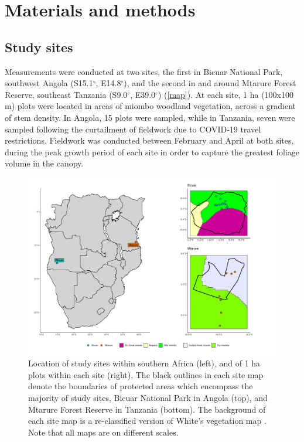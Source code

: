 \documentclass[11pt,a4paper]{article}
\begin{document}
\section{Materials and methods}

\subsection{Study sites}

Measurements were conducted at two sites, the first in Bicuar National Park, southwest Angola (S15.1$^\circ$, E14.8$^\circ$), and the second in and around Mtarure Forest Reserve, southeast Tanzania (S9.0$^\circ$, E39.0$^\circ$) (\autoref{map}). At each site, 1 ha (100x100 m) plots were located in areas of miombo woodland vegetation, across a gradient of stem density. In Angola, 15 plots were sampled, while in Tanzania, seven were sampled following the curtailment of fieldwork due to COVID-19 travel restrictions. Fieldwork was conducted between February and April at both sites, during the peak growth period of each site in order to capture the greatest foliage volume in the canopy.

\begin{figure}[H]
\centering
	\includegraphics[width=\textwidth]{map}
	\caption{Location of study sites within southern Africa (left), and of 1 ha plots within each site (right). The black outlines in each site map denote the boundaries of protected areas which encompass the majority of study sites, Bicuar National Park in Angola (top), and Mtarure Forest Reserve in Tanzania (bottom). The background of each site map is a re-classified version of White's vegetation map \citep{White1983}. Note that all maps are on different scales.}
	\label{map}
\end{figure}
\end{document}
